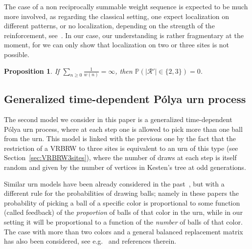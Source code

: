 \documentclass[11pt]{article}
\newtheorem {prop} {Proposition} [section]
\newcommand{\1}{{\text{\Large $\mathfrak 1$}}}
\begin{document}
The case of a non reciprocally summable weight sequence is expected to be much more involved, as regarding the classical setting, one expect localization on different patterns, or no localization, depending on the strength of the reinforcement, see~\cite{BSS,BSS2,CK,Sch12,Sch21,S,T1,V}. In our case, our understanding is rather fragmentary at the moment,  for we can only show that localization on two or three sites is not possible.  
\begin{prop}\label{prop.3sites}
If $\sum_{n\ge 0} \tfrac 1{w(n)}=\infty$, then $\mathbb P(|\mathcal R'|\in \{2,3\})=0$. 
\end{prop}




\subsection{Generalized time-dependent P\'olya urn process} 
The second model we consider in this paper is a generalized time-dependent P\'olya urn process, where at each step one is allowed to pick more than one ball from the urn. This model is linked with the previous one by 
the fact that the restriction of a VRBRW to three sites is equivalent to an urn of this type (see Section~\ref{sec:VRBRW3sites}), where the number of draws at each step is itself random and given by the number of vertices in Kesten's tree at odd generations. 

\vspace{0,2cm}
Similar urn models have been already considered in the past~\cite{RT24,Si18a,Si18b}, but with a different rule for the probabilities of drawing balls; namely in these papers the probability of picking a ball of a specific color is proportional to some function (called feedback) of the {\em proportion} of balls of that color in the urn, while in our setting it will be proportional to a function of the {\em number} of balls of that color. The case with more than two colors and a general balanced replacement matrix has also been considered, see e.g.~\cite{KS,KM17,KMP,LMS,MS25} and references therein.  
\end{document}
